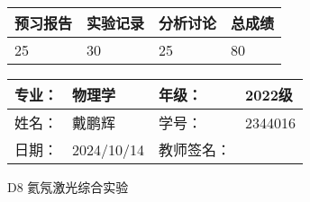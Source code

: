 \documentclass[dvipsnames, svgnames,a4paper,11pt]{article}
\begin{document}
\begin{table}
	\renewcommand\arraystretch{1.7}
	\begin{tabularx}{\textwidth}{
		|X|X|X|X
		|X|X|X|X|}
	\hline
	\multicolumn{2}{|c|}{预习报告}&\multicolumn{2}{|c|}{实验记录}&\multicolumn{2}{|c|}{分析讨论}&\multicolumn{2}{|c|}{总成绩}\\
	\hline
	\LARGE25 & & \LARGE30 & & \LARGE25 & & \LARGE80 & \\
	\hline
	\end{tabularx}
\end{table}


\begin{table}
	\renewcommand\arraystretch{1.7}
	\begin{tabularx}{\textwidth}{|X|X|X|X|}
	\hline
	专业：& 物理学 &年级：& 2022级\\
	\hline
	姓名：& 戴鹏辉  & 学号： & 2344016 \\
	\hline
	日期：& 2024/10/14 & 教师签名：& \\
	\hline
	\end{tabularx}
\end{table}

\begin{center}
	\LARGE D8 \quad 氦氖激光综合实验
\end{center}
\end{document}
